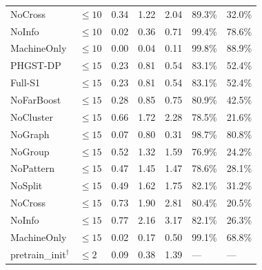 \begin{table}[p]
\begin{tabularx}{\textwidth}{@{}lXXXXXX@{}}
NoCross & $\le 10$ & 0.34 & 1.22 & 2.04 & 89.3\% & 32.0\% \\
NoInfo & $\le 10$ & 0.02 & 0.36 & 0.71 & 99.4\% & 78.6\% \\
MachineOnly & $\le 10$ & 0.00 & 0.04 & 0.11 & 99.8\% & 88.9\% \\
\midrule
PHGST-DP & $\le 15$ & 0.23 & 0.81 & 0.54 & 83.1\% & 52.4\% \\
Full-S1 & $\le 15$ & 0.23 & 0.81 & 0.54 & 83.1\% & 52.4\% \\
NoFarBoost & $\le 15$ & 0.28 & 0.85 & 0.75 & 80.9\% & 42.5\% \\
NoCluster & $\le 15$ & 0.66 & 1.72 & 2.28 & 78.5\% & 21.6\% \\
NoGraph & $\le 15$ & 0.07 & 0.80 & 0.31 & 98.7\% & 80.8\% \\
NoGroup & $\le 15$ & 0.52 & 1.32 & 1.59 & 76.9\% & 24.2\% \\
NoPattern & $\le 15$ & 0.47 & 1.45 & 1.47 & 78.6\% & 28.1\% \\
NoSplit & $\le 15$ & 0.49 & 1.62 & 1.75 & 82.1\% & 31.2\% \\
NoCross & $\le 15$ & 0.73 & 1.90 & 2.81 & 80.4\% & 20.5\% \\
NoInfo & $\le 15$ & 0.77 & 2.16 & 3.17 & 82.1\% & 26.3\% \\
MachineOnly & $\le 15$ & 0.02 & 0.17 & 0.50 & 99.1\% & 68.8\% \\
\midrule
pretrain\_init$^\dagger$ & $\le 2$ & 0.09 & 0.38 & 1.39 & --- & --- \\
\bottomrule
\end{tabularx}
\end{table}

